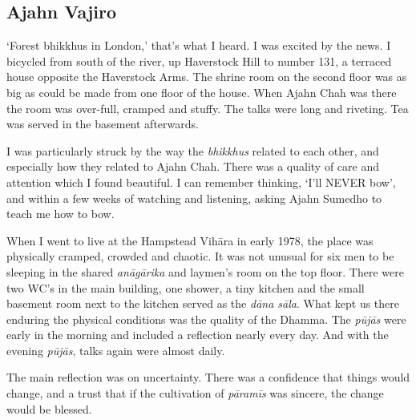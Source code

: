 \subsection{Ajahn Vajiro}

`Forest bhikkhus in London,' that's what I heard. I was excited by the
news. I bicycled from south of the river, up Haverstock Hill to number
131, a terraced house opposite the Haverstock Arms. The shrine room on
the second floor was as big as could be made from one floor of the
house. When Ajahn Chah was there the room was over-full, cramped and
stuffy. The talks were long and riveting. Tea was served in the basement
afterwards. 

I was particularly struck by the way the \emph{bhikkhus} related to each
other, and especially how they related to Ajahn Chah. There was a
quality of care and attention which I found beautiful. I can remember
thinking, `I'll NEVER bow', and within a few weeks of watching and
listening, asking Ajahn Sumedho to teach me how to bow. 

When I went to live at the Hampstead Vihāra in early 1978, the place was
physically cramped, crowded and chaotic. It was not unusual for six men
to be sleeping in the shared \emph{anāgārika} and laymen's room on the top
floor. There were two WC's in the main building, one shower, a tiny
kitchen and the small basement room next to the kitchen served as the
\emph{dāna sāla}. What kept us there enduring the physical conditions
was the quality of the Dhamma. The \emph{pūjās} were early in the
morning and included a reflection nearly every day. And with the evening
\emph{pūjās}, talks again were almost daily. 

The main reflection was on uncertainty. There was a confidence that
things would change, and a trust that if the cultivation of
\emph{pāramīs} was sincere, the change would be blessed. 

